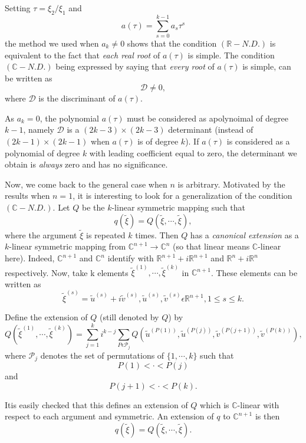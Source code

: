 Setting $\tau = \xi_{2} / \xi_{1}$ and
$$
a(\tau) = \sum\limits_{s=0}^{k-1} a_{s} \tau^{s}
$$
the method we used when $a_{k} \neq 0$ shows that the condition $(\mathbb{R}-N.D.)$ is equivalent to the fact that {\em each real root} of $a(\tau)$ is simple. The condition $(\mathbb{C}-N.D.)$ being expressed by saying that {\em every root} of $a(\tau)$ is simple, can be written as
$$
\mathscr{D} \neq 0,
$$
where $\mathscr{D}$ is the discriminant of $a(\tau)$.

\begin{remark}\label{chap2-rem2.2}
As $a_{k} = 0$, the polynomial $a(\tau)$ must be considered as a\pageoriginale polynoimal of degree $k-1$, namely $\mathscr{D}$ is a $(2k-3) \times (2k-3)$ determinant (instead of $(2k-1) \times (2k-1)$ when $a(\tau)$ is of degree $k$). If $a(\tau)$ is considered as a polynomial of degree $k$ with leading coefficient equal to zero, the determinant we obtain is {\em always} zero and has no significance.
\end{remark}

Now, we come back to the general case when $n$ is arbitrary. Motivated by the results when $n = 1$, it is interesting to look for a generalization of the condition $(\mathbb{C}-N.D.)$. Let $Q$ be the $k$-linear symmetric mapping such that
$$
q(\widetilde{\xi}) = Q(\widetilde{\xi}, \cdots, \widetilde{\xi}),
$$
where the argument $\widetilde{\xi}$ is repeated $k$ times. Then $Q$ has a {\em canonical extension} as a $k$-linear symmetric mapping from $\mathbb{C}^{n+1} \to \mathbb{C}^{n}$ (so that linear means $\mathbb{C}$-linear here). Indeed, $\mathbb{C}^{n+1}$ and $\mathbb{C}^{n}$ identify with $\mathbb{R}^{n+1} + i \mathbb{R}^{n+1}$ and $\mathbb{R}^{n} + i \mathbb{R}^{n}$ respectively. Now, take k elements $\widetilde{\xi}^{(1)} , \cdots , \widetilde{\xi}^{(k)}$ in $\mathbb{C}^{n+1}$. These elements can be written as
$$
\widetilde{\xi}^{(s)} = \widetilde{u}^{(s)} + i\widetilde{v}^{(s)}, \widetilde{u}^{(s)}, \widetilde{v}^{(s)} \epsilon \mathbb{R}^{n+1}, 1 \leq s \leq k.
$$

Define the extension of $Q$ (still denoted by $Q$) by
$$
Q(\widetilde{\xi}^{(1)}, \cdots, \widetilde{\xi}^{(k)}) = \sum\limits_{j=1}^{k} i^{k-j} \sum\limits_{P \epsilon \mathscr{P}_{j}} Q(\widetilde{u}^{(P(1))}, \widetilde{u}^{(P(j))}, \widetilde{v}^{(P(j+1))}, \widetilde{v}^{(P(k))}),
$$
where $\mathscr{P}_{j}$ denotes the set of permutations of $\{1, \cdots, k\}$ such that 
$$
P(1) <\cdot< P(j)
$$
and
$$
P(j+1) <\cdot< P(k).
$$

It\pageoriginale is easily checked that this defines an extension of $Q$ which is $\mathbb{C}$-linear with respect to each argument and symmetric. An extension of $q$ to $\mathbb{C}^{n+1}$ is then
\begin{equation*}
q(\widetilde{\xi}) = Q(\widetilde{\xi}, \cdots, \widetilde{\xi}).\tag{2.12}\label{chap2-eq2.12}
\end{equation*}


